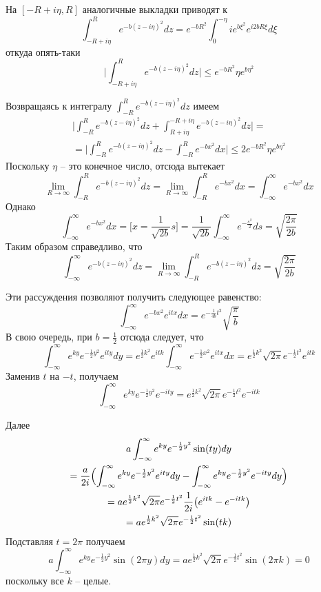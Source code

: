 \documentclass[a4paper]{article}
\begin{document}
\noindent На $[-R+i\eta, R]$ аналогичные выкладки приводят к
\[
\int_{-R+i\eta}^R e^{-b (z - i\eta)^2} dz
= e^{-bR^2} \int_0^{-\eta} i e^{b\xi^2} e^{i 2bR\xi} d\xi
\]
откуда опять-таки 
\[
\biggl\lvert \int_{-R+i\eta}^R e^{-b (z - i\eta)^2} dz \biggr\rvert
\leq e^{-bR^2} \eta e^{b\eta^2}
\]

\noindent Возвращаясь к интегралу $\int_{-R}^R e^{-b (z - i\eta)^2} dz$ имеем
\begin{multline*}
	\biggl\lvert \int_{-R}^R e^{-b (z - i\eta)^2} dz +
		\int_{R+i\eta}^{-R+i\eta} e^{-b (z - i\eta)^2} dz \biggr\rvert = \\
	= \biggl\lvert \int_{-R}^R e^{-b (z - i\eta)^2} dz -
		\int_{-R}^R e^{-b x^2} dx \biggr\rvert \leq 2 e^{-bR^2} \eta e^{b\eta^2}
\end{multline*}
Поскольку $\eta$ -- это конечное число, отсюда вытекает 
\[
\lim_{R\to\infty}\int_{-R}^R e^{-b (z - i\eta)^2} dz
= \lim_{R\to\infty} \int_{-R}^R e^{-b x^2} dx
= \int_{-\infty}^\infty e^{-b x^2} dx
\]
Однако
\[
\int_{-\infty}^\infty e^{-b x^2} dx
= \bigl[ x = \frac{1}{\sqrt{2b}}s\bigr]
= \frac{1}{\sqrt{2b}} \int_{-\infty}^\infty e^{-\frac{s^2}{2}} ds
= \sqrt{\frac{2\pi}{2b}}
\]
Таким образом справедливо, что 
\[
\int_{-\infty}^\infty e^{-b (z - i\eta)^2} dz
= \lim_{R\to\infty} \int_{-R}^R e^{-b (z - i\eta)^2} dz
= \sqrt{\frac{2\pi}{2b}}
\]

\noindent Эти рассуждения позволяют получить следующее равенство:
\[
\int_{-\infty}^\infty e^{-b x^2} e^{it x} dx
= e^{-\frac{1}{4b}t^2} \sqrt{\frac{\pi}{b}}
\]
В свою очередь, при $b=\frac{1}{2}$ отсюда следует, что
\[
\int_{-\infty}^\infty e^{ky} e^{-\frac{1}{2}y^2} e^{it y} dy
= e^{\frac{1}{2}k^2} e^{it k} \int_{-\infty}^\infty e^{-\frac{1}{2}x^2} e^{it x} dx
= e^{\frac{1}{2}k^2} \sqrt{2\pi} e^{-\frac{1}{2}t^2} e^{it k}
\]
Заменив $t$ на $-t$, получаем
\[
\int_{-\infty}^\infty e^{ky} e^{-\frac{1}{2}y^2} e^{-it y}
= e^{\frac{1}{2} k^2} \sqrt{2\pi} e^{-\frac{1}{2}t^2} e^{-it k}
\]

\noindent Далее
\begin{multline*}
	a \int_{-\infty}^\infty e^{ky} e^{-\frac{1}{2}y^2} \sin(t y) dy \\
	= \frac{a}{2i} \Bigl( \int_{-\infty}^\infty e^{ky} e^{-\frac{1}{2}y^2} e^{it y} dy
		- \int_{-\infty}^\infty e^{ky} e^{-\frac{1}{2}y^2} e^{-it y} dy \Bigr)\\
	= a e^{\frac{1}{2}k^2} \sqrt{2\pi} e^{-\frac{1}{2}t^2} \frac{1}{2i} \bigl( e^{it k} - e^{-it k}\bigr)\\
	= a e^{\frac{1}{2}k^2} \sqrt{2\pi} e^{-\frac{1}{2}t^2} \sin(t k)
\end{multline*}
Подставляя $t = 2\pi$ получаем
\[
a \int_{-\infty}^\infty e^{ky} e^{-\frac{1}{2}y^2} \sin(2\pi y) dy
= a e^{\frac{1}{2}k^2} \sqrt{2\pi} e^{-\frac{1}{2}t^2} \sin( 2\pi k)
= 0
\]
поскольку все $k$ -- целые.
\end{document}
